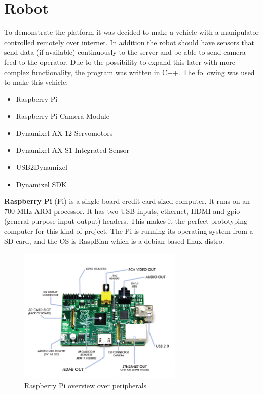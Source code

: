 \section{Robot}
To demonstrate the platform it was decided to make a vehicle with a manipulator controlled remotely over internet. In addition the robot should have sensors that send data (if available) continuously to the server and be able to send camera feed to the operator. Due to the possibility to expand this later with more complex functionality, the program was written in C++.
The following was used to make this vehicle:
\begin{itemize}
    \item Raspberry Pi
    \item Raspberry Pi Camera Module
    \item Dynamixel AX-12 Servomotors
    \item Dynamixel AX-S1 Integrated Sensor
    \item USB2Dynamixel
    \item Dynamixel SDK
\end{itemize}
\vspace{\secspace}

\textbf{Raspberry Pi} (Pi) is a single board credit-card-sized computer. It runs on an 700 MHz ARM processor.
It has two USB inputs, ethernet, HDMI and gpio (general purpose input output) headers. 
This makes it the perfect prototyping computer for this kind of project. 
The Pi is running its operating system from a SD card, and the OS is RaspBian which is a debian based linux distro.

\begin{figure}[H]
    \centering
    \includegraphics[width=0.7\textwidth]{graphics/Raspberry_Pi.png}	
    \caption{Raspberry Pi overview over peripherals}
    \label{fig:RPi}
\end{figure}


